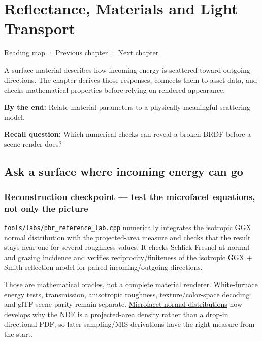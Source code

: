 \hypertarget{03-visual-computing-i-ch005}{}
\chapter{Reflectance, Materials and Light Transport}\label{03-visual-computing-i-ch005-reflectance-materials-and-light-transport}

\hyperref[volume-reading-map]{Reading map} · \hyperref[03-visual-computing-i-ch004-sampling-filtering-and-reconstruction]{Previous chapter} · \hyperref[03-visual-computing-i-ch006-from-material-data-to-gpu-bindings]{Next chapter}

A surface material describes how incoming energy is scattered toward outgoing directions. The chapter derives those responses, connects them to asset data, and checks mathematical properties before relying on rendered appearance.

\textbf{By the end:} Relate material parameters to a physically meaningful scattering model.

\textbf{Recall question:} Which numerical checks can reveal a broken BRDF before a scene render does?

\section{Ask a surface where incoming energy can go}\label{03-visual-computing-i-ch005-ask-a-surface-where-incoming-energy-can-go}

\subsection{Reconstruction checkpoint --- test the microfacet equations, not only the picture}\label{03-visual-computing-i-ch005-reconstruction-checkpoint-test-the-microfacet-equations-not-only-the-picture}

\texttt{tools/labs/pbr\_reference\_lab.cpp} numerically integrates the isotropic GGX normal distribution with the projected-area measure and checks that the result stays near one for several roughness values. It checks Schlick Fresnel at normal and grazing incidence and verifies reciprocity/finiteness of the isotropic GGX + Smith reflection model for paired incoming/outgoing directions.

Those are mathematical oracles, not a complete material renderer. White-furnace energy tests, transmission, anisotropic roughness, texture/color-space decoding and glTF scene parity remain separate. \hyperref[appendix-885c1cb64ae9]{Microfacet normal distributions} now develops why the NDF is a projected-area density rather than a drop-in directional PDF, so later sampling/MIS derivations have the right measure from the start.

